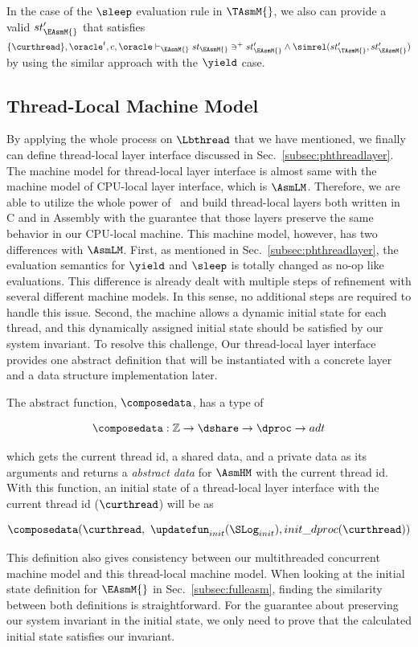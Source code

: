 In the case of the $\sleep$ evaluation rule in $\TAsmM{}$, we also can provide a valid $st'_{\EAsmM{}}$ that satisfies 
$\{\curthread\}, \oracle^{t}, c, \oracle\vdash_{\EAsmM{}} st_{\EAsmM{}} \ni^{+} st'_{\EAsmM{}} \wedge \simrel(st'_{\TAsmM{}}, st'_{\EAsmM{}})$ by using the similar approach with the $\yield$ case.


\subsection{Thread-Local Machine Model}\label{subsec:hasm}
By applying the whole process on $\Lbthread$ that we have mentioned,
we finally can define thread-local layer interface  discussed in Sec.~\ref{subsec:phthreadlayer}.
The machine model for thread-local layer interface is almost same with the machine model of CPU-local layer interface, which is $\AsmLM$.
Therefore, we are able to 
utilize the whole power of \compcertx\ and build thread-local layers both written in C and in Assembly with the guarantee that those layers preserve the same behavior in our CPU-local machine.
This machine model, however, has two differences with  $\AsmLM$.
First, as mentioned in Sec.~\ref{subsec:phthreadlayer}, the evaluation semantics
for $\yield$ and $\sleep$ is totally changed as no-op like evaluations.
This difference is already dealt with multiple steps of refinement with several different machine models. 
In this sense, no additional steps are required to handle this issue.
Second, the machine allows a dynamic initial state for each thread, and this dynamically assigned 
initial state should be satisfied by our system invariant.
To resolve this challenge, 
Our thread-local layer interface provides one abstract definition that will be
instantiated with a concrete layer and a data structure implementation later.

The abstract function, $\composedata$, has a type of
\begin{small}
\[
\composedata : \mathbb{Z} \rightarrow \dshare \rightarrow \dproc \rightarrow adt
\]
\end{small}
which gets the current thread id, a shared data, and a private data as its arguments 
and returns a \textit{abstract data} for $\AsmHM$ with the current thread id.
With this function, an initial state of a thread-local layer interface with the current thread id ($\curthread$) will be 
as
\begin{small}
\[
\composedata(\curthread, \ \updatefun_{init}(\SLog_{init}), init\_dproc(\curthread))
\]
\end{small}
This definition also gives consistency between our multithreaded concurrent machine model 
and this thread-local machine model.
When looking at the initial state definition for $\EAsmM{}$ in Sec.~\ref{subsec:fulleasm},
finding the similarity between both definitions is straightforward.
For the guarantee about preserving our system invariant in the initial state, we only need to prove that 
the calculated initial state satisfies our invariant.

